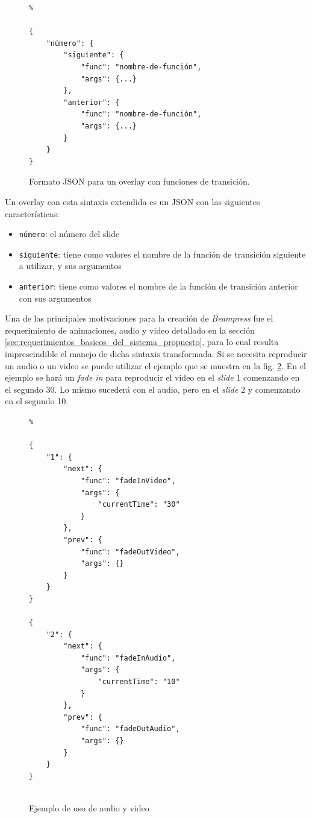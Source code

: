 		\begin{figure}[htb]%
			\begin{lstlisting}%

{
    "número": {
        "siguiente": {
            "func": "nombre-de-función",
            "args": {...}
        },
        "anterior": {
            "func": "nombre-de-función",
            "args": {...}
        }
    }
}	
			\end{lstlisting}
		\caption{
			Formato JSON para un overlay con funciones de transición. 
			\label{fig:json_format} }
		\end{figure}


	Un overlay con esta sintaxis extendida es un JSON con las siguientes características:
	\begin{itemize}
		\item \texttt{número}: el número del slide
		\item \texttt{siguiente}: tiene como valores el nombre de la función de transición siguiente a utilizar, y sus argumentos
		\item \texttt{anterior}: tiene como valores el nombre de la función de transición anterior con sus argumentos
	\end{itemize}

	Una de las principales motivaciones para la creación de \textit{Beampress} fue el requerimiento de animaciones, audio y video detallado en la sección \ref{sec:requerimientos_basicos_del_sistema_propuesto}, para lo cual resulta imprescindible el manejo de dicha sintaxis transformada. Si se necesita reproducir un audio o un video se puede utilizar el ejemplo que se muestra en la fig. \ref{fig:ex_audio_video_syntax}. En el ejemplo se hará un \textit{fade in} para reproducir el video en el \textit{slide} 1 comenzando en el segundo 30. Lo mismo sucederá con el audio, pero en el \textit{slide} 2 y comenzando en el segundo 10.


	\begin{figure}[htb]%
		\begin{lstlisting}%

{
    "1": {
        "next": {
            "func": "fadeInVideo",
            "args": {
                "currentTime": "30"
            }
        },
        "prev": {
            "func": "fadeOutVideo",
            "args": {}
        }
    }
}

{
    "2": {
        "next": {
            "func": "fadeInAudio",
            "args": {
                "currentTime": "10"
            }
        },
        "prev": {
            "func": "fadeOutAudio",
            "args": {}
        }
    }
}
				
		\end{lstlisting}
		\caption{Ejemplo de uso de audio y video} 
			\label{fig:ex_audio_video_syntax}
		\end{figure}

